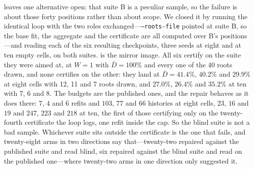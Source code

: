 \documentclass[conference]{IEEEtran}
\begin{document}
 leaves one alternative open: that suite B is a peculiar sample, so the failure is about those forty positions rather than about scope. We closed it by running the identical loop with the two roles exchanged---\texttt{--roots-file} pointed at suite B, so the base fit, the aggregate and the certificate are all computed over B's positions---and reading each of the six resulting checkpoints, three seeds at eight and at ten empty cells, on both suites.  is the mirror image. All six certify on the suite they were aimed at, at $W=1$ with $\bar D=100\%$ and every one of the 40 roots drawn, and none certifies on the other: they land at $\bar D=41.4\%$, $40.2\%$ and $29.9\%$ at eight cells with 12, 11 and 7 roots drawn, and $27.0\%$, $26.4\%$ and $35.2\%$ at ten with 7, 6 and 8. The budgets are the published ones, and the repair behaves as it does there: $7$, $4$ and $6$ refits and $103$, $77$ and $66$ histories at eight cells, $23$, $16$ and $19$ and $247$, $223$ and $218$ at ten, the first of those certifying only on the twenty-fourth certificate the loop logs, one refit inside the cap. So the blind suite is not a bad sample. Whichever suite sits outside the certificate is the one that fails, and twenty-eight arms in two directions say that---twenty-two repaired against the published suite and read blind, six repaired against the blind suite and read on the published one---where twenty-two arms in one direction only suggested it.
\end{document}
